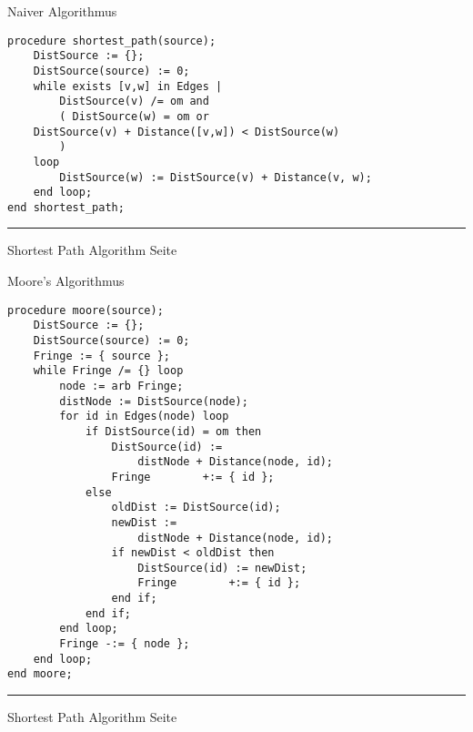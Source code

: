 
\begin{slide}{}
\normalsize

\begin{center}
Naiver Algorithmus
\end{center}
\vspace*{0.5cm}

\footnotesize
\begin{verbatim}
procedure shortest_path(source);
    DistSource := {};
    DistSource(source) := 0;
    while exists [v,w] in Edges | 
        DistSource(v) /= om and 
        ( DistSource(w) = om or 
    DistSource(v) + Distance([v,w]) < DistSource(w)
        )
    loop
        DistSource(w) := DistSource(v) + Distance(v, w);
    end loop;
end shortest_path;
\end{verbatim}

\vspace*{\fill}
\tiny \addtocounter{mypage}{-27}
\rule{17cm}{1mm}
Shortest Path Algorithm  \hspace*{\fill} Seite 
\end{slide}


\begin{slide}{}
\normalsize

\begin{center}
Moore's Algorithmus
\end{center}
\vspace*{0.5cm}

\footnotesize
\begin{verbatim}
procedure moore(source);
    DistSource := {};
    DistSource(source) := 0;
    Fringe := { source };
    while Fringe /= {} loop
        node := arb Fringe;
        distNode := DistSource(node);
        for id in Edges(node) loop
            if DistSource(id) = om then
                DistSource(id) := 
                    distNode + Distance(node, id);
                Fringe        +:= { id };
            else
                oldDist := DistSource(id);
                newDist := 
                    distNode + Distance(node, id);
                if newDist < oldDist then
                    DistSource(id) := newDist;
                    Fringe        +:= { id };
                end if;
            end if;
        end loop;
        Fringe -:= { node };
    end loop;
end moore;
\end{verbatim}

\vspace*{\fill}
\tiny \addtocounter{mypage}{1}
\rule{17cm}{1mm}
Shortest Path Algorithm  \hspace*{\fill} Seite 
\end{slide}

